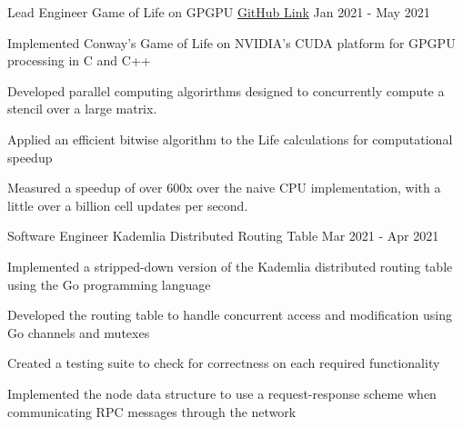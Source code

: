 

\begin{cventries}

  \cventry
    {Lead Engineer} %
    {Game of Life on GPGPU} %
    {\href{https://github.com/nbarrios1337/bitwise-GoL-GPGPU}{GitHub Link}} %
    {Jan 2021 - May 2021} %
    {
      \begin{cvitems} %
        \item Implemented Conway's Game of Life on NVIDIA's CUDA platform for GPGPU processing in C and C++
        \item Developed parallel computing algorirthms designed to concurrently compute a stencil over a large matrix.
        \item Applied an efficient bitwise algorithm to the Life calculations for computational speedup
        \item Measured a speedup of over 600x over the naive CPU implementation, with a little over a billion cell updates per second.
      \end{cvitems}
    }

  \cventry
    {Software Engineer} %
    {Kademlia Distributed Routing Table} %
    {} %
    {Mar 2021 - Apr 2021} %
    {
      \begin{cvitems} %
        \item Implemented a stripped-down version of the Kademlia distributed routing table using the Go programming language
        \item Developed the routing table to handle concurrent access and modification using Go channels and mutexes
        \item Created a testing suite to check for correctness on each required functionality
        \item Implemented the node data structure to use a request-response scheme when communicating RPC messages through the network
      \end{cvitems}
    }


\end{cventries}
